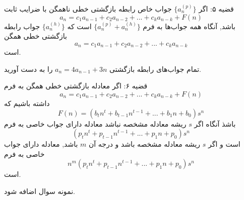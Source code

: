 
\begin{THEOREM}
    قضیه ۵:
    اگر 
    $\{a^{(p)}_n\}$
    جواب خاص رابطه‌ بازگشتی خطی ناهمگن با ضرایب ثابت
    \[a_n=c_{1}a_{n-1}+c_{2}a_{n-2}+...+c_{k}a_{n-k}+F(n)\]
    باشد,
    آنگاه همه جواب‌ها به فرم 
    $\{a^{(p)}_n+a^{(h)}_n\}$
    است که
    $\{a^{(h)}_n\}$
    جواب رابطه‌ بازگشتی خطی همگن
    \[a_n=c_{1}a_{n-1}+c_{2}a_{n-2}+...+c_{k}a_{n-k}\]
    است.
\end{THEOREM}

\begin{PROBLEM}
    تمام جواب‌های رابطه‌ بازگشتی
    $a_n=4a_{n-1}+3n$
    را به دست آورید.
\end{PROBLEM}

\begin{THEOREM}
    قضیه ۶:
    اگر معادله بازگشتی خطی همگن به فرم
    \[a_n=c_{1}a_{n-1}+c_{2}a_{n-2}+...+c_{k}a_{n-k}+F(n)\]
    داشته باشیم که
    \[F(n)=(b_tn^t+b_{t-1}n^{t-1}+...+b_1n+b_0)s^n\]
    باشذ آنگاه اگر 
    $s$
    ریشه معادله مشخصه نباشد معادله دارای جواب خاصی به فرم
    \[(p_tn^t+p_{t-1}n^{t-1}+...+p_1n+p_0)s^n\]
    است و اگر
    $s$
    ریشه معادله مشخصه باشد و درجه آن 
    $m$
    باشد, معادله دارای جواب خاصی به فرم
    \[n^m(p_tn^t+p_{t-1}n^{t-1}+...+p_1n+p_0)s^n\]
    است.
\end{THEOREM}

\begin{PROBLEM}
    نمونه سوال اضافه شود.
\end{PROBLEM}